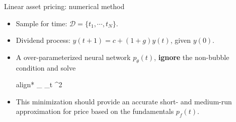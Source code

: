 \documentclass[aspectratio=169,10pt]{beamer}
\newcommand{\emphcolor}[1]{\textbf{\textcolor{emphcolorval}{#1}}}
\begin{document}
\begin{frame}{Linear asset pricing: numerical method}
	\begin{itemize}
		\item Sample for time:  $\mathcal{D} = \{t_1,\cdots,t_N\}$.
		\item Dividend process: $y(t+1) = c+(1+g)y(t)$, given $y(0)$.
		\item A over-parameterized neural network $p_\theta(t)$, \emphcolor{ignore} the non-bubble condition and solve 
				\begin{empheq}[box=\tcbhighmath]{align*}
				\min_{\theta} \sum_{t \in {}} ^2
			\end{empheq}
		\item This minimization should provide an accurate short- and medium-run approximation for price based on the fundamentals $p_f(t)$.
	\end{itemize}
	
\end{frame}
\end{document}
